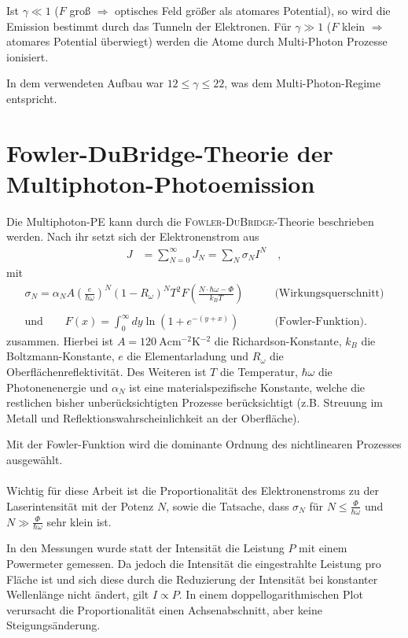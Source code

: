 \documentclass[bachelor,       %
               twoside,        %
               BCOR10mm,       %
               english,ngerman, %
               ]{GAUBM}
\begin{document}
Ist $\gamma\ll 1$ ($F$ groß $\Rightarrow$ optisches Feld gr\"o{\ss}er als atomares Potential), so wird die Emission bestimmt durch das Tunneln der Elektronen.
Für $\gamma\gg 1$ ($F$ klein $\Rightarrow$ atomares Potential \"uberwiegt) werden die Atome durch Multi-Photon Prozesse ionisiert.\newline

In dem verwendeten Aufbau war $12\leq\gamma\leq22$, was dem Multi-Photon-Regime entspricht.

\section{Fowler-DuBridge-Theorie der Multiphoton-Photoemission}
Die Multiphoton-PE kann durch die \textsc{Fowler-DuBridge}-Theorie beschrieben werden\cite{bechtel_1977}\cite{girardeau_1995}.
Nach ihr setzt sich der Elektronenstrom aus
\begin{align}
J&=\sum_{N=0}^\infty J_N=\sum_N\sigma_NI^N \quad ,
\end{align}
mit
\begin{align*}
\sigma_N=\alpha_NA\left(\frac{e}{\hbar\omega}\right)^N(1-R_\omega)^NT^2F\left(\frac{N\cdot \hbar\omega-\Phi}{k_BT}\right)\qquad&\text{(Wirkungsquerschnitt)}\\\\
\text{und}\qquad F(x)=\int_0^\infty dy\ln \left(1+e^{-(y+x)}\right)\qquad &\text{(Fowler-Funktion).}
\end{align*}
zusammen.
Hierbei ist $A=\SI{120}{\A\cm^{-2}\K^{-2}}$ die Richardson-Konstante, $k_B$ die Boltzmann-Konstante, $e$ die Elementarladung und $R_\omega$ die Oberflächenreflektivität.
Des Weiteren ist $T$ die Temperatur, $\hbar\omega$ die Photonenenergie und $\alpha_N$ ist eine materialspezifische Konstante, welche die restlichen bisher unberücksichtigten Prozesse berücksichtigt (z.B. Streuung im Metall und Reflektionswahrscheinlichkeit an der Oberfläche)\cite{brogle}.

Mit der Fowler-Funktion wird die dominante Ordnung des nichtlinearen Prozesses ausgewählt.\\\\

Wichtig für diese Arbeit ist die Proportionalität des Elektronenstroms zu der Laserintensität mit der Potenz $N$, sowie die Tatsache, dass $\sigma_N$ f\"ur $N\leq\frac{\Phi}{\hbar\omega}$ und $N\gg\frac{\Phi}{\hbar\omega}$ sehr klein ist.



In den Messungen wurde statt der Intensität die Leistung $P$ mit einem Powermeter gemessen.
Da jedoch die Intensität die eingestrahlte Leistung pro Fläche ist und sich diese durch die Reduzierung der Intensität bei konstanter Wellenlänge nicht ändert, gilt $I\propto P$.
In einem doppellogarithmischen Plot verursacht die Proportionalität einen Achsenabschnitt, aber keine Steigungsänderung.
\end{document}
